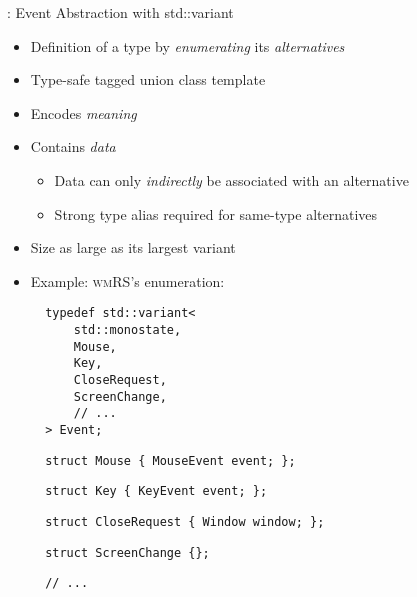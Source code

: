 \begin{frame}[c,fragile]{\underline{\cpp}: Event Abstraction with std::variant \hfill {\footnotesize \currentname}}


    \begin{itemize}

        \item Definition of a type by \textit{enumerating} its \textit{alternatives}

        \item Type-safe tagged union class template

        \item Encodes \textit{meaning}

        \item Contains \textit{data}
            \begin{itemize}
                \item Data can only \textit{indirectly} be associated with an alternative
                \item Strong type alias required for same-type alternatives
            \end{itemize}

        \item Size as large as its largest variant

        \item Example: \textsc{wmRS}'s  enumeration:\\
\begin{minipage}[t]{.45\linewidth}
\begin{verbatim}
  typedef std::variant<
      std::monostate,
      Mouse,
      Key,
      CloseRequest,
      ScreenChange,
      // ...
  > Event;
\end{verbatim}
\end{minipage}%
\begin{minipage}[t]{.45\linewidth}
\begin{verbatim}
  struct Mouse { MouseEvent event; };
\end{verbatim}
\begin{verbatim}
  struct Key { KeyEvent event; };
\end{verbatim}
\begin{verbatim}
  struct CloseRequest { Window window; };
\end{verbatim}
\begin{verbatim}
  struct ScreenChange {};
\end{verbatim}
\begin{verbatim}
  // ...
\end{verbatim}
\end{minipage}

    \end{itemize}

    \vfill

\end{frame}
